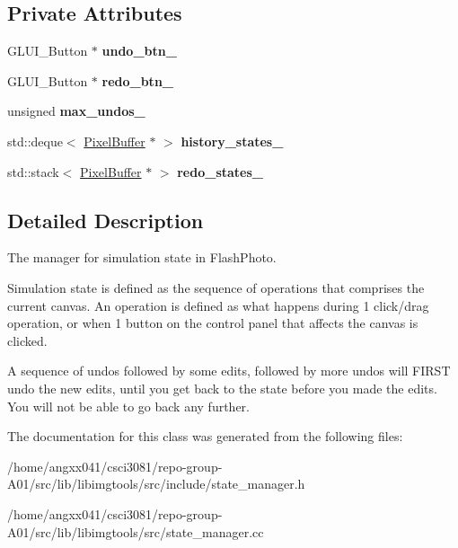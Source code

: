 \subsection*{Private Attributes}
\begin{DoxyCompactItemize}
\item 
G\+L\+U\+I\+\_\+\+Button $\ast$ {\bfseries undo\+\_\+btn\+\_\+}\hypertarget{classimage__tools_1_1StateManager_adbe2820d914eb5ba08de3dfcc61aa82d}{}\label{classimage__tools_1_1StateManager_adbe2820d914eb5ba08de3dfcc61aa82d}

\item 
G\+L\+U\+I\+\_\+\+Button $\ast$ {\bfseries redo\+\_\+btn\+\_\+}\hypertarget{classimage__tools_1_1StateManager_a6fd0aef5e8fc7b52cf6f9de416ac4825}{}\label{classimage__tools_1_1StateManager_a6fd0aef5e8fc7b52cf6f9de416ac4825}

\item 
unsigned {\bfseries max\+\_\+undos\+\_\+}\hypertarget{classimage__tools_1_1StateManager_a01880162d6098bca3fa61e551365c214}{}\label{classimage__tools_1_1StateManager_a01880162d6098bca3fa61e551365c214}

\item 
std\+::deque$<$ \hyperlink{classimage__tools_1_1PixelBuffer}{Pixel\+Buffer} $\ast$ $>$ {\bfseries history\+\_\+states\+\_\+}\hypertarget{classimage__tools_1_1StateManager_afbf08670a705b087ae0e0235404151dd}{}\label{classimage__tools_1_1StateManager_afbf08670a705b087ae0e0235404151dd}

\item 
std\+::stack$<$ \hyperlink{classimage__tools_1_1PixelBuffer}{Pixel\+Buffer} $\ast$ $>$ {\bfseries redo\+\_\+states\+\_\+}\hypertarget{classimage__tools_1_1StateManager_a451e9938df3ecde4fad4e45892a8634a}{}\label{classimage__tools_1_1StateManager_a451e9938df3ecde4fad4e45892a8634a}

\end{DoxyCompactItemize}


\subsection{Detailed Description}
The manager for simulation state in Flash\+Photo. 

Simulation state is defined as the sequence of operations that comprises the current canvas. An operation is defined as what happens during 1 click/drag operation, or when 1 button on the control panel that affects the canvas is clicked.

A sequence of undos followed by some edits, followed by more undos will F\+I\+R\+ST undo the new edits, until you get back to the state before you made the edits. You will not be able to go back any further. 

The documentation for this class was generated from the following files\+:\begin{DoxyCompactItemize}
\item 
/home/angxx041/csci3081/repo-\/group-\/\+A01/src/lib/libimgtools/src/include/state\+\_\+manager.\+h\item 
/home/angxx041/csci3081/repo-\/group-\/\+A01/src/lib/libimgtools/src/state\+\_\+manager.\+cc\end{DoxyCompactItemize}
